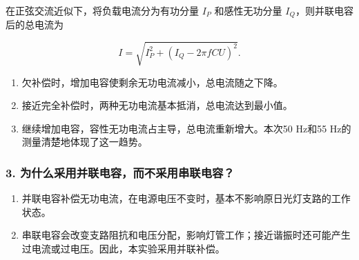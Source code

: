 在正弦交流近似下，将负载电流分为有功分量 $I_P$ 和感性无功分量 $I_Q$，则并联电容后的总电流为

\[
I=\sqrt{I_P^2+(I_Q-2\pi fCU)^2}.
\]

\begin{enumerate}
\item 欠补偿时，增加电容使剩余无功电流减小，总电流随之下降。
\item 接近完全补偿时，两种无功电流基本抵消，总电流达到最小值。
\item 继续增加电容，容性无功电流占主导，总电流重新增大。本次50 Hz和55 Hz的测量清楚地体现了这一趋势。

\end{enumerate}
\subsubsection*{3. 为什么采用并联电容，而不采用串联电容？}

\begin{enumerate}
\item 并联电容补偿无功电流，在电源电压不变时，基本不影响原日光灯支路的工作状态。
\item 串联电容会改变支路阻抗和电压分配，影响灯管工作；接近谐振时还可能产生过电流或过电压。因此，本实验采用并联补偿。
\end{enumerate}
